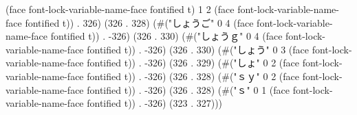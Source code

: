(face font-lock-variable-name-face fontified t) 1 2 (face font-lock-variable-name-face fontified t)) . 326) (326 . 328) (#("しょうご" 0 4 (face font-lock-variable-name-face fontified t)) . -326) (326 . 330) (#("しょうｇ" 0 4 (face font-lock-variable-name-face fontified t)) . -326) (326 . 330) (#("しょう" 0 3 (face font-lock-variable-name-face fontified t)) . -326) (326 . 329) (#("しょ" 0 2 (face font-lock-variable-name-face fontified t)) . -326) (326 . 328) (#("ｓｙ" 0 2 (face font-lock-variable-name-face fontified t)) . -326) (326 . 328) (#("ｓ" 0 1 (face font-lock-variable-name-face fontified t)) . -326) (323 . 327)))

